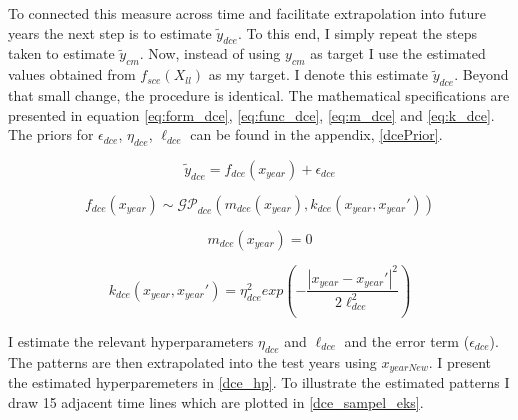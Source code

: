 \documentclass[a4paper]{article}
\begin{document}
To connected this measure across time and facilitate extrapolation into future years the next step is to estimate $\tilde{y}_{dce}$. To this end, I simply repeat the steps taken to estimate $\tilde{y}_{cm}$. Now, instead of using $y_{cm}$ as target I use the estimated values obtained from $f_{sce}(X_{ll})$ as my target. I denote this estimate $\tilde{y}_{dce}$. Beyond that small change, the procedure is identical. The mathematical specifications are presented in equation \ref{eq:form_dce}, \ref{eq:func_dce}, \ref{eq:m_dce} and \ref{eq:k_dce}. The priors for $\epsilon_{dce}$, $\eta_{dce}$, $\ell_{dce}$ can be found in the appendix, \autoref{dcePrior}.\par

\[
\tilde{y}_{dce} = f_{dce}(x_{year}) + \epsilon_{dce} \tag{27} \label{eq:form_dce}
\]

\[
f_{dce}(x_{year}) \sim \mathcal{GP}_{dce}(m_{dce}(x_{year}),k_{dce}(x_{year},x_{year}')) \tag{28} \label{eq:func_dce}
\]

\[
m_{dce}(x_{year}) = 0 \tag{21} \label{eq:m_dce}
\]

\[
k_{dce}(x_{year},x_{year}') = \eta_{dce}^2 exp\left(-\frac{|x_{year}-x_{year}'|^2}{2\ell_{dce}^2}\right) \tag{29} \label{eq:k_dce}
\]

I estimate the relevant hyperparameters $\eta_{dce}$ and $\ell_{dce}$ and the error term ($\epsilon_{dce}$). The patterns are then extrapolated into the test years using $x_{yearNew}$. I present the estimated hyperparemeters in \autoref{dce_hp}. To illustrate the estimated patterns I draw 15 adjacent time lines which are plotted in \autoref{dce_sampel_eks}.\par 
\end{document}
